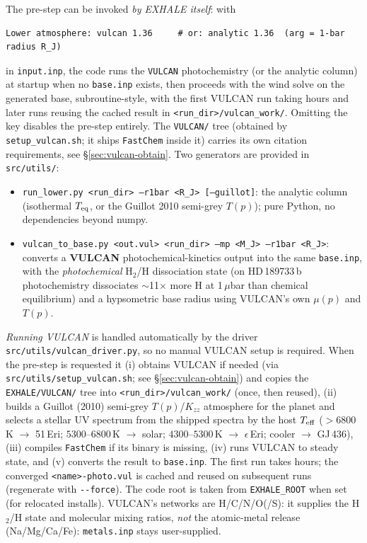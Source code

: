 \documentclass[english,a4paper]{my_memo}
\begin{document}
The pre-step can be invoked \emph{by EXHALE itself}: with
\begin{verbatim}
Lower atmosphere: vulcan 1.36     # or: analytic 1.36  (arg = 1-bar radius R_J)
\end{verbatim}
in \texttt{input.inp}, the code runs the \texttt{VULCAN}
photochemistry (or the analytic column) at startup when no \texttt{base.inp}
exists, then proceeds with the wind solve on the generated base,
subroutine-style, with the first VULCAN run taking hours and later runs
reusing the cached result in \texttt{<run\_dir>/vulcan\_work/}. Omitting the
key disables the pre-step entirely. The \texttt{VULCAN/} tree (obtained by
\texttt{setup\_vulcan.sh}; it ships \texttt{FastChem} inside it) carries its own
citation requirements, see \S\ref{sec:vulcan-obtain}. Two generators are
provided in \texttt{src/utils/}:
\begin{itemize}
\item \texttt{run\_lower.py <run\_dir> --r1bar <R\_J> [--guillot]}: the
  analytic column (isothermal $T_{\rm eq}$, or the Guillot 2010 semi-grey
  $T(p)$); pure Python, no dependencies beyond numpy.
\item \texttt{vulcan\_to\_base.py <out.vul> <run\_dir> --mp <M\_J> --r1bar
  <R\_J>}: converts a \textbf{VULCAN} photochemical-kinetics output into the
  same \texttt{base.inp}, with the \emph{photochemical} H$_2$/H dissociation
  state (on HD\,189733\,b photochemistry dissociates $\sim$11$\times$ more H
  at 1\,$\mu$bar than chemical equilibrium) and a hypsometric base radius using
  VULCAN's own $\mu(p)$ and $T(p)$.
\end{itemize}
\emph{Running VULCAN} is handled automatically by the driver
\texttt{src/utils/vulcan\_driver.py}, so no manual VULCAN setup is required.
When the pre-step is requested it (i) obtains VULCAN if needed
(via \texttt{src/utils/setup\_vulcan.sh}; see \S\ref{sec:vulcan-obtain}) and copies the
\texttt{EXHALE/VULCAN/} tree into \texttt{<run\_dir>/vulcan\_work/} (once, then reused), (ii) builds a
Guillot (2010) semi-grey $T(p)$/$K_{zz}$ atmosphere for the planet and selects a
stellar UV spectrum from the shipped spectra by the host $T_{\rm eff}$ ($>6800$\,K
$\to$ 51\,Eri; $5300$--$6800$\,K $\to$ solar; $4300$--$5300$\,K $\to$
$\epsilon$\,Eri; cooler $\to$ GJ\,436), (iii) compiles \texttt{FastChem} if its
binary is missing, (iv) runs VULCAN to steady state, and (v) converts the result
to \texttt{base.inp}. The first run takes hours; the converged
\texttt{<name>-photo.vul} is cached and reused on subsequent runs (regenerate
with \texttt{-{}-force}). The code root is taken from \texttt{EXHALE\_ROOT} when
set (for relocated installs). VULCAN's networks are H/C/N/O(/S): it supplies the
H$_2$/H state and molecular mixing ratios, \emph{not} the atomic-metal release
(Na/Mg/Ca/Fe): \texttt{metals.inp} stays user-supplied.
\end{document}
